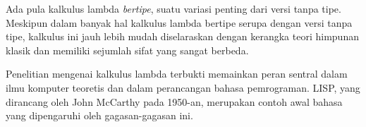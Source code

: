 \documentclass[../../../include/open-logic-section]{subfiles}
\begin{document}
\begin{digress}
Ada pula kalkulus lambda \emph{bertipe}, suatu variasi penting dari versi
tanpa tipe. Meskipun dalam banyak hal kalkulus lambda bertipe serupa dengan
versi tanpa tipe, kalkulus ini jauh lebih mudah diselaraskan dengan kerangka
teori himpunan klasik dan memiliki sejumlah sifat yang sangat berbeda.

Penelitian mengenai kalkulus lambda terbukti memainkan peran sentral dalam
ilmu komputer teoretis dan dalam perancangan bahasa pemrograman. LISP, yang
dirancang oleh John McCarthy pada 1950-an, merupakan contoh awal bahasa yang
dipengaruhi oleh gagasan-gagasan ini.
\end{digress}
\end{document}

